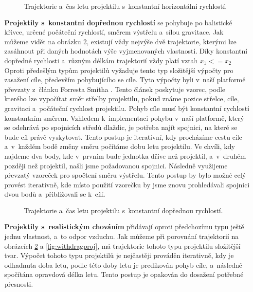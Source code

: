 \begin{figure}[h]
	\centering
	\def\svgwidth{0.7\textwidth}
	
	\caption{Trajektorie a~čas letu projektilu s~konstantní horizontální rychlostí.}
	\label{fig:horizontalproj}
\end{figure}

\textbf{Projektily s~konstantní dopřednou rychlostí} se pohybuje po balistické křivce, určené počáteční rychlostí, směrem výstřelu a~sílou gravitace. Jak můžeme vidět na obrázku \ref{fig:forwardproj}, existují vždy nejvýše dvě trajektorie, kterými lze zasáhnout při daných hodnotách výše vyjmenovaných vlastností. Díky konstantní dopředné rychlosti a~různým délkám trajektorií vždy platí vztah \(x_1 <= x_2\) Oproti předešlým typům projektilů vyžaduje tento typ složitější výpočty pro zasažení cíle, především pohybujícího se cíle. Tyto výpočty byli v~naší platformě převzaty z~článku Forresta Smitha \citep{site:projectilecalc}. Tento článek poskytuje vzorec, podle kterého lze vypočítat směr střelby projektilu, pokud známe pozice střelce, cíle, gravitaci a~počáteční rychlost projektilu. Pohyb cíle musí být konstantní rychlostí konstantním směrem. Vzhledem k~implementaci pohybu v~naší platformě, který se odehrává po spojnicích středů dlaždic, je potřeba najít spojnici, na které se bude cíl právě vyskytovat. Tento postup je iterativní, kdy procházíme cestu cíle a~v~každém bodě změny směru počítáme dobu letu projektilu. Ve chvíli, kdy najdeme dva body, kde v~prvním bude jednotka dříve než projektil, a~v~druhém později než projektil, našli jsme požadovanou spojnici. Následně využijeme převzatý vzoreček pro spočtení směru výstřelu. Tento postup by bylo možné celý provést iterativně, kde místo použití vzorečku by jsme znovu prohledávali spojnici dvou bodů a~přibližovali se k~cíli.

\begin{figure}[h]
	\centering
	\def\svgwidth{0.7\textwidth}
	
	\caption{Trajektorie a~čas letu projektilu s~konstantní dopřednou rychlostí.}
	\label{fig:forwardproj}
\end{figure}

\textbf{Projektily s~realistickým chováním} přidávají oproti předchozímu typu ještě jednu vlastnost, a~to odpor vzduchu. Jak můžeme při porovnání trajektorií na obrázcích \ref{fig:forwardproj} a \ref{fig:withdragproj}, má trajektorie tohoto typu projektilu složitější tvar.  Výpočet tohoto typu projektilů je nejčastěji prováděn iterativně, kdy je odhadnuta doba letu, podle této doby letu je predikován pohyb cíle, a~následně spočítána opravdová délka letu. Tento postup je opakován do dosažení potřebné přesnosti.

